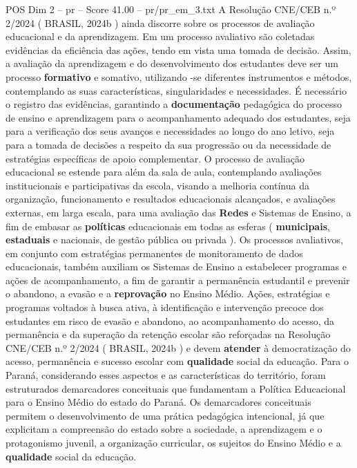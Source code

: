 \begin{textsample}{POS Dim 2 – pr – Score 41.00 – pr/pr\_em\_3.txt}
A Resolução CNE/CEB n.º 2/2024 ( BRASIL, 2024b ) ainda discorre sobre os processos de avaliação educacional e da aprendizagem.
Em um processo avaliativo são coletadas evidências da eficiência das ações, tendo em vista uma tomada de decisão.
Assim, a avaliação da aprendizagem e do desenvolvimento dos estudantes deve ser um processo \textbf{formativo} e somativo, utilizando -se diferentes instrumentos e métodos, contemplando as suas características, singularidades e necessidades.
É necessário o registro das evidências, garantindo a \textbf{documentação} pedagógica do processo de ensino e aprendizagem para o acompanhamento adequado dos estudantes, seja para a verificação dos seus avanços e necessidades ao longo do ano letivo, seja para a tomada de decisões a respeito da sua progressão ou da necessidade de estratégias específicas de apoio complementar.
O processo de avaliação educacional se estende para além da sala de aula, contemplando avaliações institucionais e participativas da escola, visando a melhoria contínua da organização, funcionamento e resultados educacionais alcançados, e avaliações externas, em larga escala, para uma avaliação das \textbf{Redes} e Sistemas de Ensino, a fim de embasar as \textbf{políticas} educacionais em todas as esferas ( \textbf{municipais}, \textbf{estaduais} e nacionais, de gestão pública ou privada ).
Os processos avaliativos, em conjunto com estratégias permanentes de monitoramento de dados educacionais, também auxiliam os Sistemas de Ensino a estabelecer programas e ações de acompanhamento, a fim de garantir a permanência estudantil e prevenir o abandono, a evasão e a \textbf{reprovação} no Ensino Médio.
Ações, estratégias e programas voltados à busca ativa, à identificação e intervenção precoce dos estudantes em risco de evasão e abandono, ao acompanhamento do acesso, da permanência e da superação da retenção escolar são reforçadas na Resolução CNE/CEB n.º 2/2024 ( BRASIL, 2024b ) e devem \textbf{atender} à democratização do acesso, permanência e sucesso escolar com \textbf{qualidade} social da educação.
Para o Paraná, considerando esses aspectos e as características do território, foram estruturados demarcadores conceituais que fundamentam a Política Educacional para o Ensino Médio do estado do Paraná.
Os demarcadores conceituais permitem o desenvolvimento de uma prática pedagógica intencional, já que explicitam a compreensão do estado sobre a sociedade, a aprendizagem e o protagonismo juvenil, a organização curricular, os sujeitos do Ensino Médio e a \textbf{qualidade} social da educação.

\end{textsample}
